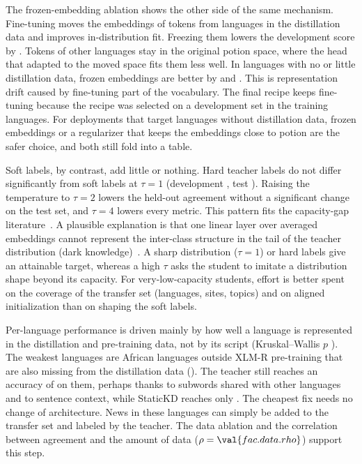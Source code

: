 The frozen-embedding ablation shows the other side of the same mechanism. Fine-tuning moves the embeddings of tokens from languages in the distillation data and improves in-distribution fit. Freezing them lowers the development score by . Tokens of other languages stay in the original potion space, where the head that adapted to the moved space fits them less well. In languages with no or little distillation data, frozen embeddings are better by  and . This is representation drift caused by fine-tuning part of the vocabulary. The final recipe keeps fine-tuning because the recipe was selected on a development set in the training languages. For deployments that target languages without distillation data, frozen embeddings or a regularizer that keeps the embeddings close to potion are the safer choice, and both still fold into a table.

Soft labels, by contrast, add little or nothing. Hard teacher labels do not differ significantly from soft labels at $\tau=1$ (development , test ). Raising the temperature to $\tau=2$ lowers the held-out agreement without a significant change on the test set, and $\tau=4$ lowers every metric. This pattern fits the capacity-gap literature~\cite{zhang2025law,wang2026rckd}. A plausible explanation is that one linear layer over averaged embeddings cannot represent the inter-class structure in the tail of the teacher distribution (dark knowledge)~\cite{zhao2022dkd}. A sharp distribution ($\tau=1$) or hard labels give an attainable target, whereas a high $\tau$ asks the student to imitate a distribution shape beyond its capacity. For very-low-capacity students, effort is better spent on the coverage of the transfer set (languages, sites, topics) and on aligned initialization than on shaping the soft labels.

Per-language performance is driven mainly by how well a language is represented in the distillation and pre-training data, not by its script (Kruskal--Wallis $p$ ). The weakest languages are African languages outside XLM-R pre-training that are also missing from the distillation data (). The teacher still reaches an accuracy of  on them, perhaps thanks to subwords shared with other languages and to sentence context, while StaticKD reaches only . The cheapest fix needs no change of architecture. News in these languages can simply be added to the transfer set and labeled by the teacher. The data ablation and the correlation between agreement and the amount of data ($\rho=\val{fac.data.rho}$) support this step.


